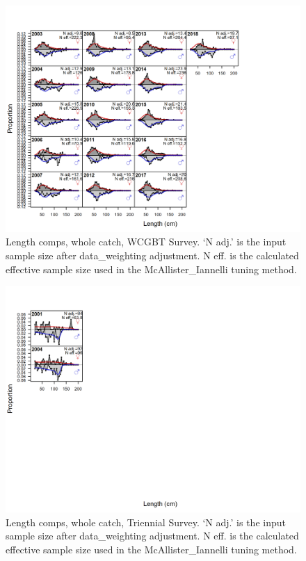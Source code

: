 \documentclass[12pt,]{article}
\begin{document}
\begin{figure}
\centering
\includegraphics{./r4ss/plots_mod1/comp_lenfit_flt5mkt0.png}
\caption{Length comps, whole catch, WCGBT Survey. `N adj.' is the input
sample size after data\_weighting adjustment. N eff. is the calculated
effective sample size used in the McAllister\_Iannelli tuning method.
\label{fig:mod1_3_comp_lenfit_flt5mkt0}}
\end{figure}

\begin{figure}
\centering
\includegraphics{./r4ss/plots_mod1/comp_lenfit_flt6mkt0.png}
\caption{Length comps, whole catch, Triennial Survey. `N adj.' is the
input sample size after data\_weighting adjustment. N eff. is the
calculated effective sample size used in the McAllister\_Iannelli tuning
method. \label{fig:mod1_4_comp_lenfit_flt6mkt0}}
\end{figure}

\newpage

\color{black}

\renewcommand{\thepage}{}
\end{document}
